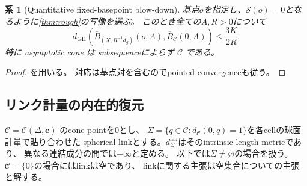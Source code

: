 \documentclass[11pt,a4paper]{ltjsarticle}
\newcommand{\GH}{\operatorname{GH}}
\newcommand{\cC}{\mathcal C}
\newcommand{\cS}{\mathcal S}
\newcommand{\ov}{\overline}
\theoremstyle{plain}
\newtheorem{corollary}[corollary]{系}
\theoremstyle{definition}
\theoremstyle{remark}
\begin{document}
\begin{corollary}[Quantitative fixed-basepoint blow-down]
\label{cor:GH}
基点$o$を指定し、$\cS(o)=0$となるように\cref{thm:rough}の写像を選ぶ。
このとき全ての$A,R>0$について
\[
 d_{\GH}\!\left(
 \ov B_{(X,R^{-1}d_g)}(o,A),
 \ov B_\cC(0,A)
 \right)\le\frac{3K}{2R}.
\]
特に asymptotic cone は subsequenceによらず $\cC$ である。
\end{corollary}
\begin{proof}
を用いる。
対応は基点対を含むのでpointed convergenceも従う。
\end{proof}

\subsection{リンク計量の内在的復元}
$\cC=\cC(\Delta,\bm c)$ のcone pointを$0$とし、
$\Sigma=\{q\in\cC:d_\cC(0,q)=1\}$を各cellの球面計量で貼り合わせた
spherical linkとする。$d_\Sigma^{\mathrm{len}}$はそのintrinsic length metricであり、
異なる連結成分の間では$+\infty$と定める。
以下では$\Sigma\ne\varnothing$の場合を扱う。$\cC=\{0\}$の場合にはlinkは空であり、
linkに関する主張は空集合についての主張と解する。
\end{document}
